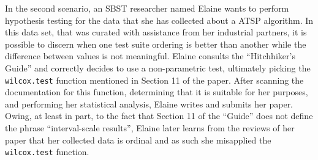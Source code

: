 In the second scenario, an SBST researcher named Elaine wants to perform hypothesis testing for the data that she has
collected about a ATSP algorithm. In this data set, that was curated with assistance from her industrial partners, it is
possible to discern when one test suite ordering is better than another while the difference between values is not
meaningful. Elaine consults the ``Hitchhiker's Guide'' and correctly decides to use a non-parametric test, ultimately
picking the {\tt wilcox.test} function mentioned in Section 11 of the paper. After scanning the documentation for this
function, determining that it is suitable for her purposes, and performing her statistical analysis, Elaine writes and
submits her paper. Owing, at least in part, to the fact that Section 11 of the ``Guide'' does not define the phrase
``interval-scale results'', Elaine later learns from the reviews of her paper that her collected data is ordinal and
as such she misapplied the {\tt wilcox.test} function.


